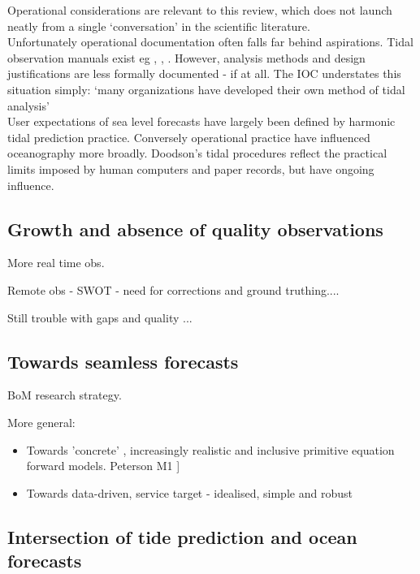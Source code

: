 Operational considerations are relevant to this review, which does not launch neatly from a single `conversation' \citep{Booth:2009vy} in the scientific literature.\\
Unfortunately operational documentation often falls far behind aspirations.
Tidal observation manuals exist eg \citep{IOC:2005tj}, \citep{Level:2011wu}, \citep{Parker:2007wq}.  However, analysis methods and design justifications are less formally documented - if at all.  The IOC understates this situation simply: `many organizations have developed their own method of tidal analysis'\citep{IOC:2005tj}\\

User expectations of sea level forecasts have largely been defined by harmonic tidal prediction practice. 
Conversely operational practice have influenced oceanography more broadly. Doodson's \citep{Doodson:1928wf} tidal procedures reflect the practical limits imposed by human computers and paper records, but have ongoing influence. \\
\subsection{Growth and absence of quality observations}

More real time obs.

Remote obs - SWOT - need for corrections and ground truthing....

Still trouble with gaps and quality ...

\subsection{Towards seamless forecasts}

BoM research strategy.


More general:

\begin{itemize}
  \item Towards 'concrete' , increasingly realistic and inclusive primitive equation forward models.
Peterson M1 ]\citep{Petersen:2012tr}
 \item Towards data-driven, service target - idealised, simple and robust 
\end{itemize}

\subsection{Intersection of tide prediction and ocean forecasts}
\label{S:two_perspectives}

